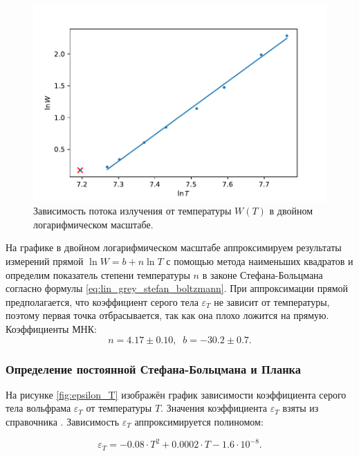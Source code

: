 \documentclass[10pt,a4paper]{article}
\begin{document}
\begin{multicols}{2}
	\begin{figure}[H]
		\includegraphics[width=1\textwidth]{gen/fig-linwt.pdf}
		\caption{Зависимость потока излучения от температуры $W(T)$ в двойном логарифмическом масштабе.}
		\label{fig:lnw_lnt}
	\end{figure}
	
	На графике в двойном логарифмическом масштабе аппроксимируем результаты измерений прямой $\ln W = b + n \ln T$ с помощью метода наименьших квадратов и определим показатель степени температуры $n$ в законе Стефана-Больцмана согласно формулы \ref{eq:lin_grey_stefan_boltzmann}. При аппроксимации прямой предполагается, что коэффициент серого тела $\varepsilon_T$ не зависит от температуры, поэтому первая точка отбрасывается, так как она плохо ложится на прямую. Коэффициенты МНК: \\
	$$n = 4.17 \pm 0.10,\;\; b = -30.2 \pm 0.7.$$
	
	\subsubsection*{Определение постоянной Стефана-Больцмана и Планка}
	
	На рисунке \ref{fig:epsilon_T} изображён график зависимости коэффициента серого тела вольфрама $\varepsilon_T$ от температуры $T$. Значения коэффициента $\varepsilon_T$ взяты из справочника \cite[стр.~236]{labnik}. Зависимость $\varepsilon_T$ аппроксимируется полиномом:
	
	$$ \varepsilon_T = -0.08 \cdot T^2 + 0.0002 \cdot T -1.6 \cdot 10^{-8}. $$
		

\end{multicols}
\end{document}

